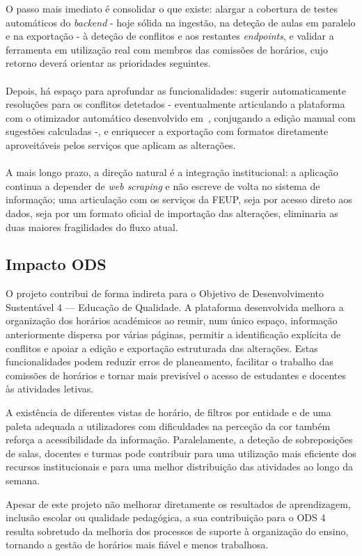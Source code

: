 \documentclass[10pt]{article}
\begin{document}
    O passo mais imediato é consolidar o que existe: alargar a cobertura de testes automáticos do \emph{backend} - hoje sólida na ingestão, na deteção de aulas em paralelo e na exportação - à deteção de conflitos e aos restantes \emph{endpoints}, e validar a ferramenta em utilização real com membros das comissões de horários, cujo retorno deverá orientar as prioridades seguintes.
    \\\\
    Depois, há espaço para aprofundar as funcionalidades: sugerir automaticamente resoluções para os conflitos detetados - eventualmente articulando a plataforma com o otimizador automático desenvolvido em~\cite{lopes2024}, conjugando a edição manual com sugestões calculadas -, e enriquecer a exportação com formatos diretamente aproveitáveis pelos serviços que aplicam as alterações.
    \\\\
    A mais longo prazo, a direção natural é a integração institucional: a aplicação continua a depender de \emph{web scraping} e não escreve de volta no sistema de informação; uma articulação com os serviços da FEUP, seja por acesso direto aos dados, seja por um formato oficial de importação das alterações, eliminaria as duas maiores fragilidades do fluxo atual. 

\subsection{Impacto ODS}

O projeto contribui de forma indireta para o Objetivo de Desenvolvimento Sustentável 4 — Educação de Qualidade. A plataforma desenvolvida melhora a organização dos horários académicos ao reunir, num único espaço, informação anteriormente dispersa por várias páginas, permitir a identificação explícita de conflitos e apoiar a edição e exportação estruturada das alterações. Estas funcionalidades podem reduzir erros de planeamento, facilitar o trabalho das comissões de horários e tornar mais previsível o acesso de estudantes e docentes às atividades letivas.

A existência de diferentes vistas de horário, de filtros por entidade e de uma paleta adequada a utilizadores com dificuldades na perceção da cor também reforça a acessibilidade da informação. Paralelamente, a deteção de sobreposições de salas, docentes e turmas pode contribuir para uma utilização mais eficiente dos recursos institucionais e para uma melhor distribuição das atividades ao longo da semana.

Apesar de este projeto não melhorar diretamente os resultados de aprendizagem, inclusão escolar ou qualidade pedagógica, a sua contribuição para o ODS 4 resulta sobretudo da melhoria dos processos de suporte à organização do ensino, tornando a gestão de horários mais fiável e menos trabalhosa.


 
 
\end{document}
